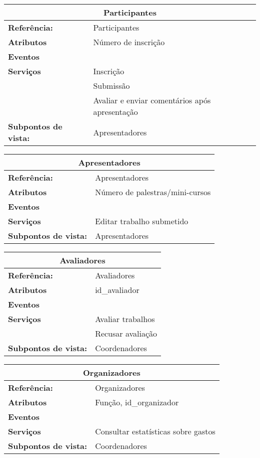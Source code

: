 \documentclass[letter]{article}
\begin{document}
\begin{center}

\begin{table}[h!]

\begin{center}
\begin{tabular}{|ll|}
\hline 
\multicolumn{2}{|c|}{\textbf{Participantes}}\tabularnewline
\hline
\textbf{Referência:} & Participantes\tabularnewline
\textbf{Atributos} & Número de inscrição\tabularnewline
\textbf{Eventos} & \tabularnewline
\textbf{Serviços} & Inscrição\tabularnewline
 & Submissão\tabularnewline
 & Avaliar e enviar comentários após apresentação\tabularnewline
\textbf{Subpontos de vista:} & Apresentadores \tabularnewline
\hline
\end{tabular}
\end{center}
\end{table}


%
\begin{table}[h!]


\begin{center}
\begin{tabular}{|ll|}
\hline 
\multicolumn{2}{|c|}{\textbf{Apresentadores}}\tabularnewline
\hline
\textbf{Referência:} & Apresentadores\tabularnewline
\textbf{Atributos} & Número de palestras/mini-cursos\tabularnewline
\textbf{Eventos} & \tabularnewline
\textbf{Serviços} & Editar trabalho submetido\tabularnewline
\textbf{Subpontos de vista:} & Apresentadores \tabularnewline
\hline
\end{tabular}

\end{center}
\end{table}


%
\begin{table}[h!]
\begin{center}
\begin{tabular}{|ll|}
\hline 
\multicolumn{2}{|c|}{\textbf{Avaliadores}}\tabularnewline
\hline
\textbf{Referência:} & Avaliadores\tabularnewline
\textbf{Atributos} & id\_avaliador\tabularnewline
\textbf{Eventos} & \tabularnewline
\textbf{Serviços} & Avaliar trabalhos\tabularnewline
 & Recusar avaliação\tabularnewline
\textbf{Subpontos de vista:} & Coordenadores\tabularnewline
\hline
\end{tabular}
\end{center}
\end{table}
%
\newpage
\begin{table}[h!]
\begin{center}
\begin{tabular}{|ll|}
\hline 
\multicolumn{2}{|c|}{\textbf{Organizadores}}\tabularnewline
\hline
\textbf{Referência:} & Organizadores\tabularnewline
\textbf{Atributos} & Função, id\_organizador\tabularnewline
\textbf{Eventos} & \tabularnewline
\textbf{Serviços} & Consultar estatísticas sobre gastos\tabularnewline
\textbf{Subpontos de vista:} & Coordenadores\tabularnewline
\hline
\end{tabular}
\end{center}
\end{table}



\end{center}
\end{document}

